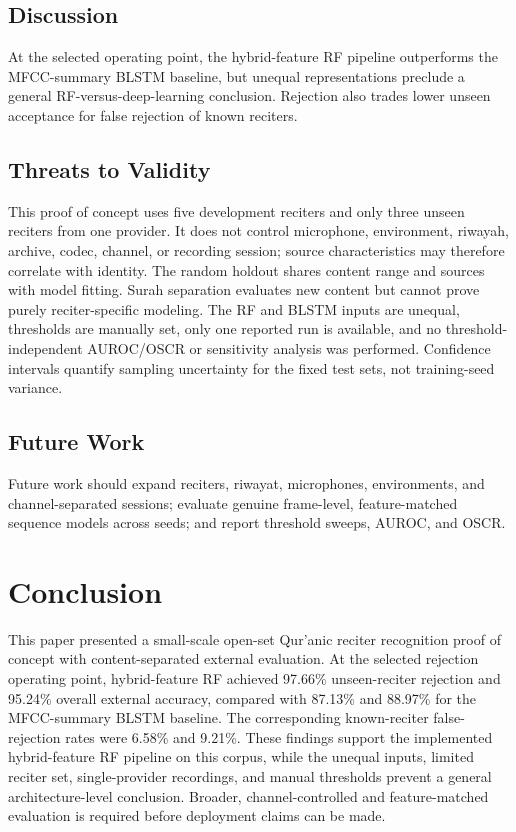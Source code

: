 \documentclass[a4paper,conference]{IEEEtran}
\begin{document}
\subsection{Discussion}

At the selected operating point, the hybrid-feature RF pipeline outperforms the MFCC-summary BLSTM baseline, but unequal representations preclude a general RF-versus-deep-learning conclusion. Rejection also trades lower unseen acceptance for false rejection of known reciters.

\subsection{Threats to Validity}

This proof of concept uses five development reciters and only three unseen reciters from one provider. It does not control microphone, environment, riwayah, archive, codec, channel, or recording session; source characteristics may therefore correlate with identity. The random holdout shares content range and sources with model fitting. Surah separation evaluates new content but cannot prove purely reciter-specific modeling. The RF and BLSTM inputs are unequal, thresholds are manually set, only one reported run is available, and no threshold-independent AUROC/OSCR or sensitivity analysis was performed. Confidence intervals quantify sampling uncertainty for the fixed test sets, not training-seed variance.

\subsection{Future Work}

Future work should expand reciters, riwayat, microphones, environments, and channel-separated sessions; evaluate genuine frame-level, feature-matched sequence models across seeds; and report threshold sweeps, AUROC, and OSCR.

\section{Conclusion}

This paper presented a small-scale open-set Qur'anic reciter recognition proof of concept with content-separated external evaluation. At the selected rejection operating point, hybrid-feature RF achieved 97.66\% unseen-reciter rejection and 95.24\% overall external accuracy, compared with 87.13\% and 88.97\% for the MFCC-summary BLSTM baseline. The corresponding known-reciter false-rejection rates were 6.58\% and 9.21\%. These findings support the implemented hybrid-feature RF pipeline on this corpus, while the unequal inputs, limited reciter set, single-provider recordings, and manual thresholds prevent a general architecture-level conclusion. Broader, channel-controlled and feature-matched evaluation is required before deployment claims can be made.



\end{document}
